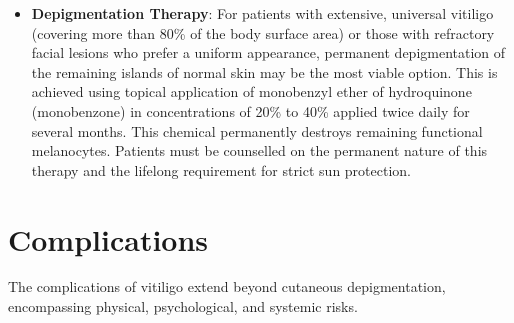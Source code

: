 \begin{itemize}
\begin{itemize}
        \item \textit{Cellular Grafting}: Involves harvesting a donor skin sample, separating the cells enzymatically, and preparing a suspension of non-cultured epidermal cells (containing melanocytes and keratinocytes) that is grafted onto a dermabraded recipient site. This technique allows a small donor site to cover a recipient area up to ten times its size.
    \end{itemize}
    \item \textbf{Depigmentation Therapy}:
    For patients with extensive, universal vitiligo (covering more than 80\% of the body surface area) or those with refractory facial lesions who prefer a uniform appearance, permanent depigmentation of the remaining islands of normal skin may be the most viable option. This is achieved using topical application of monobenzyl ether of hydroquinone (monobenzone) in concentrations of 20\% to 40\% applied twice daily for several months. This chemical permanently destroys remaining functional melanocytes. Patients must be counselled on the permanent nature of this therapy and the lifelong requirement for strict sun protection.
\end{itemize}

\section*{Complications}
The complications of vitiligo extend beyond cutaneous depigmentation, encompassing physical, psychological, and systemic risks.

